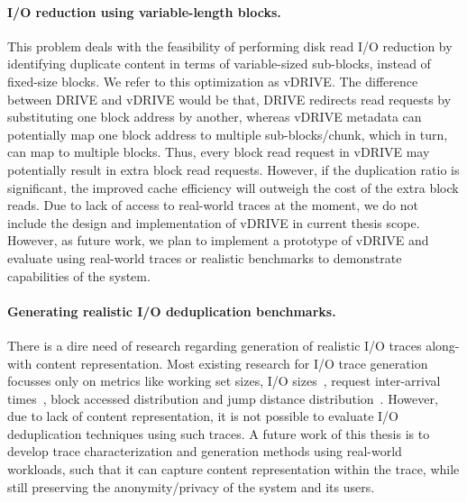 \paragraph{I/O reduction using variable-length blocks.}
This problem deals with the feasibility of performing disk
read I/O reduction by identifying duplicate content in terms of
variable-sized sub-blocks, instead of fixed-size blocks.
We refer to this optimization as vDRIVE.
The difference between DRIVE and vDRIVE would be that, DRIVE
redirects read requests by substituting one block address by
another, whereas vDRIVE metadata can potentially map one block
address to multiple sub-blocks/chunk, which in turn, can map to multiple blocks.
Thus, every block read request in vDRIVE may potentially result
in extra block read requests. However, if the duplication ratio
is significant, the improved cache efficiency will outweigh the
cost of the extra block reads.
Due to lack of access to real-world traces at the moment, we
do not include the design and implementation of vDRIVE in current
thesis scope.
However, as future work, we plan to implement a prototype of vDRIVE
and evaluate using real-world traces or
realistic benchmarks to demonstrate capabilities of the system.


\paragraph{Generating realistic I/O deduplication benchmarks.}
There is a dire need of research regarding generation of
realistic I/O traces along-with content representation. Most 
existing research for I/O trace generation focusses only on metrics
like working set sizes, I/O sizes~\cite{flexi-replay},
request inter-arrival times~\cite{storagereplay},
block accessed distribution and
jump distance distribution~\cite{jump-based-synthetic}. However,
due to lack of content representation, it is not possible
to evaluate I/O deduplication techniques using such traces.
A future work of this thesis is to develop trace
characterization and generation methods using real-world
workloads, such that it can capture
content representation within the trace, while still preserving
the anonymity/privacy of the system and its users.

